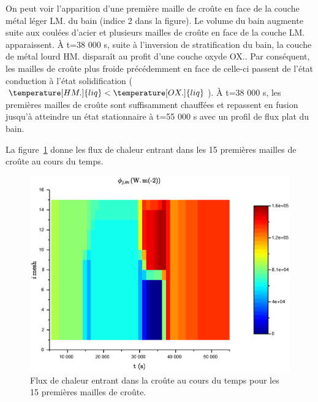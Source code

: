 On peut voir l'apparition d'une première maille de croûte en face de la couche métal léger LM. du bain (indice 2 dans la figure). Le volume du bain augmente suite aux coulées d'acier et plusieurs mailles de croûte en face de la couche LM. apparaissent. À t=38 000 s, suite à l'inversion de stratification du bain, la couche de métal lourd HM. disparaît au profit d'une couche oxyde OX.. Par conséquent, les mailles de croûte plus froide précédemment en face de celle-ci passent de l'état conduction à l'état solidification ($\temperature[HM.]{liq} < \temperature[OX.]{liq}$). À t=38 000 s, les premières mailles de croûte sont suffisamment chauffées et repassent en fusion jusqu'à atteindre un état stationnaire à t=55 000 s avec un profil de flux plat du bain.

La figure~\ref{fig:phi_in} donne les flux de chaleur entrant dans les 15 premières mailles de croûte au cours du temps. 
\begin{figure}
\centering
\includegraphics[width=\textwidth, keepaspectratio=true]{Figures/phi_in.eps}
\caption{Flux de chaleur entrant dans la croûte au cours du temps pour les 15 premières mailles de croûte.}
\label{fig:phi_in}
\end{figure}

